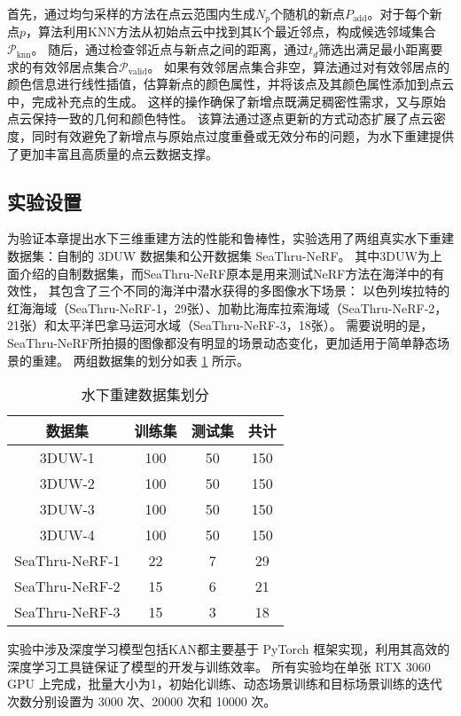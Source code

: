 首先，通过均匀采样的方法在点云范围内生成$N_p$个随机的新点$P_\text{add}$。对于每个新点$p$，算法利用KNN方法从初始点云中找到其K个最近邻点，构成候选邻域集合$\mathcal{P}_\text{knn}$。
随后，通过检查邻近点与新点之间的距离，通过$t_d$筛选出满足最小距离要求的有效邻居点集合$\mathcal{P}_\text{valid}$。
如果有效邻居点集合非空，算法通过对有效邻居点的颜色信息进行线性插值，估算新点的颜色属性，并将该点及其颜色属性添加到点云中，完成补充点的生成。
这样的操作确保了新增点既满足稠密性需求，又与原始点云保持一致的几何和颜色特性。
该算法通过逐点更新的方式动态扩展了点云密度，同时有效避免了新增点与原始点过度重叠或无效分布的问题，为水下重建提供了更加丰富且高质量的点云数据支撑。

\subsection{实验设置}
为验证本章提出水下三维重建方法的性能和鲁棒性，实验选用了两组真实水下重建数据集：自制的 3DUW 数据集和公开数据集 SeaThru-NeRF\cite{seathru}。
其中3DUW为上面介绍的自制数据集，而SeaThru-NeRF原本是用来测试NeRF方法在海洋中的有效性，
其包含了三个不同的海洋中潜水获得的多图像水下场景：
以色列埃拉特的红海海域（SeaThru-NeRF-1，29张）、加勒比海库拉索海域（SeaThru-NeRF-2，21张）和太平洋巴拿马运河水域（SeaThru-NeRF-3，18张）。
需要说明的是，SeaThru-NeRF所拍摄的图像都没有明显的场景动态变化，更加适用于简单静态场景的重建。
两组数据集的划分如表 \ref{tab:recondata_split} 所示。
\begin{table}[htbp]
    \centering
    \caption{水下重建数据集划分}
    \label{tab:recondata_split}
    \begin{tabular}{cccc}
        \toprule
        数据集 & 训练集 & 测试集 & 共计 \\
        \midrule
        3DUW-1 & 100 & 50 & 150 \\
        3DUW-2 & 100 & 50 & 150 \\
        3DUW-3 & 100 & 50 & 150 \\
        3DUW-4 & 100 & 50 & 150 \\
        SeaThru-NeRF-1 & 22 & 7 & 29 \\
        SeaThru-NeRF-2 & 15 & 6 & 21 \\
        SeaThru-NeRF-3 & 15 & 3 & 18 \\
        \bottomrule
    \end{tabular}
\end{table}

实验中涉及深度学习模型包括KAN都主要基于 PyTorch 框架\cite{pytorch}实现，利用其高效的深度学习工具链保证了模型的开发与训练效率。
所有实验均在单张 RTX 3060 GPU 上完成，批量大小为1，初始化训练、动态场景训练和目标场景训练的迭代次数分别设置为 3000 次、20000 次和 10000 次。

